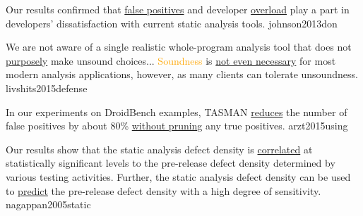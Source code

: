 \documentclass{article}
\begin{document}
  {Our results confirmed that \ul{false positives} and developer \ul{overload} play a part in developers' dissatisfaction with current static analysis tools.}
  {johnson2013don}

  {We are not aware of a single realistic whole-program analysis tool that does not \ul{purposely} make unsound choices... \textcolor{orange}{Soundness} is \ul{not even necessary} for most modern analysis applications, however, as many clients can tolerate unsoundness.}
  {livshits2015defense}

  {In our experiments on DroidBench examples, TASMAN \ul{reduces} the number of false positives by about 80\% \ul{without pruning} any true positives.}
  {arzt2015using}

  {Our results show that the static analysis defect density is \ul{correlated} at statistically significant levels to the pre-release defect density determined by various testing activities. Further, the static analysis defect density can be used to \ul{predict} the pre-release defect density with a high degree of sensitivity.}
  {nagappan2005static}



\end{document}
